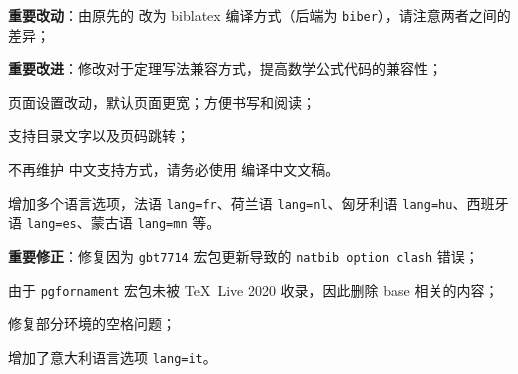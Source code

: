 \documentclass[lang=cn,newtx,10pt,scheme=chinese]{elegantbook}
\begin{document}

\begin{change}
  \item \textbf{重要改动}：由原先的  改为 biblatex 编译方式（后端为 \lstinline{biber}），请注意两者之间的差异；
  \item \textbf{重要改进}：修改对于定理写法兼容方式，提高数学公式代码的兼容性；
  \item 页面设置改动，默认页面更宽；方便书写和阅读；
  \item 支持目录文字以及页码跳转；
  \item 不再维护  中文支持方式，请务必使用  编译中文文稿。
  \item 增加多个语言选项，法语 \lstinline{lang=fr}、荷兰语 \lstinline{lang=nl}、匈牙利语 \lstinline{lang=hu}、西班牙语 \lstinline{lang=es}、蒙古语 \lstinline{lang=mn} 等。
\end{change}



\begin{change}
  \item \textbf{重要修正}：修复因为 \lstinline{gbt7714} 宏包更新导致的 \lstinline{natbib option clash} 错误；
  \item 由于 \lstinline{pgfornament} 宏包未被 \TeX~Live 2020 收录，因此删除 base 相关的内容；
  \item 修复部分环境的空格问题；
  \item 增加了意大利语言选项 \lstinline{lang=it}。
\end{change}


\end{document}
